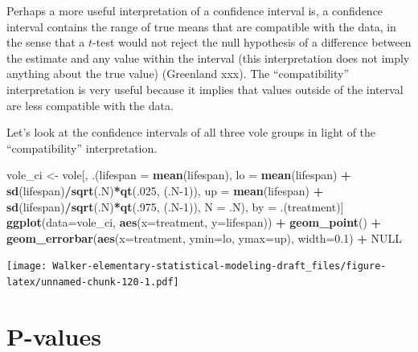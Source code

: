 \documentclass[]{book}
\newenvironment{Shaded}{\begin{snugshade}}{\end{snugshade}}
\newcommand{\DataTypeTok}[1]{\textcolor[rgb]{0.13,0.29,0.53}{#1}}
\newcommand{\DecValTok}[1]{\textcolor[rgb]{0.00,0.00,0.81}{#1}}
\newcommand{\FloatTok}[1]{\textcolor[rgb]{0.00,0.00,0.81}{#1}}
\newcommand{\KeywordTok}[1]{\textcolor[rgb]{0.13,0.29,0.53}{\textbf{#1}}}
\newcommand{\NormalTok}[1]{#1}
\newcommand{\OperatorTok}[1]{\textcolor[rgb]{0.81,0.36,0.00}{\textbf{#1}}}
\newcommand{\OtherTok}[1]{\textcolor[rgb]{0.56,0.35,0.01}{#1}}
\newcommand{\StringTok}[1]{\textcolor[rgb]{0.31,0.60,0.02}{#1}}
\begin{document}
Perhaps a more useful interpretation of a confidence interval is, a confidence interval contains the range of true means that are compatible with the data, in the sense that a \(t\)-test would not reject the null hypothesis of a difference between the estimate and any value within the interval (this interpretation does not imply anything about the true value) (Greenland xxx). The ``compatibility'' interpretation is very useful because it implies that values outside of the interval are less compatible with the data.

Let's look at the confidence intervals of all three vole groups in light of the ``compatibility'' interpretation.

\begin{Shaded}
\begin{Highlighting}[]
\NormalTok{vole_ci <-}\StringTok{ }\NormalTok{vole[, .(}\DataTypeTok{lifespan =} \KeywordTok{mean}\NormalTok{(lifespan),}
                    \DataTypeTok{lo =} \KeywordTok{mean}\NormalTok{(lifespan) }\OperatorTok{+}\StringTok{ }\KeywordTok{sd}\NormalTok{(lifespan)}\OperatorTok{/}\KeywordTok{sqrt}\NormalTok{(.N)}\OperatorTok{*}\KeywordTok{qt}\NormalTok{(.}\DecValTok{025}\NormalTok{, (.N}\DecValTok{-1}\NormalTok{)),}
                    \DataTypeTok{up =} \KeywordTok{mean}\NormalTok{(lifespan) }\OperatorTok{+}\StringTok{ }\KeywordTok{sd}\NormalTok{(lifespan)}\OperatorTok{/}\KeywordTok{sqrt}\NormalTok{(.N)}\OperatorTok{*}\KeywordTok{qt}\NormalTok{(.}\DecValTok{975}\NormalTok{, (.N}\DecValTok{-1}\NormalTok{)),}
                    \DataTypeTok{N =}\NormalTok{ .N),}
\NormalTok{                by =}\StringTok{ }\NormalTok{.(treatment)]}
\KeywordTok{ggplot}\NormalTok{(}\DataTypeTok{data=}\NormalTok{vole_ci, }\KeywordTok{aes}\NormalTok{(}\DataTypeTok{x=}\NormalTok{treatment, }\DataTypeTok{y=}\NormalTok{lifespan)) }\OperatorTok{+}
\StringTok{  }\KeywordTok{geom_point}\NormalTok{() }\OperatorTok{+}
\StringTok{  }\KeywordTok{geom_errorbar}\NormalTok{(}\KeywordTok{aes}\NormalTok{(}\DataTypeTok{x=}\NormalTok{treatment, }\DataTypeTok{ymin=}\NormalTok{lo, }\DataTypeTok{ymax=}\NormalTok{up), }
                \DataTypeTok{width=}\FloatTok{0.1}\NormalTok{) }\OperatorTok{+}
\StringTok{  }\OtherTok{NULL}
\end{Highlighting}
\end{Shaded}

\texttt{[image: Walker-elementary-statistical-modeling-draft\_files/figure-latex/unnamed-chunk-120-1.pdf]}

\hypertarget{p-values}{%
\chapter{P-values}\label{p-values}}
\end{document}
